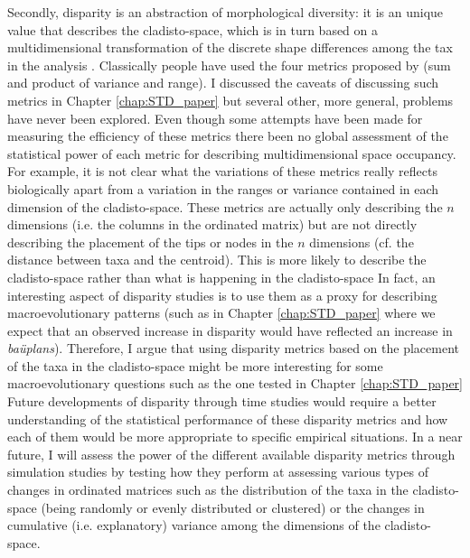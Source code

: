 Secondly, disparity is an abstraction of morphological diversity: it is an unique value that describes the cladisto-space, which is in turn based on a multidimensional transformation of the discrete shape differences among the tax in the analysis \citep{Wills1994,foote1997evolution}.
Classically people have used the four metrics proposed by \cite{Wills1994} (sum and product of variance and range).
I discussed the caveats of discussing such metrics in Chapter \ref{chap:STD_paper} but several other, more general, problems have never been explored.
Even though some attempts have been made for measuring the efficiency of these metrics \citep{Ciampaglio2001} there been no global assessment of the statistical power of each metric for describing multidimensional space occupancy.
For example, it is not clear what the variations of these metrics really reflects biologically apart from a variation in the ranges or variance contained in each dimension of the cladisto-space.
These metrics are actually only describing the $n$ dimensions (i.e. the columns in the ordinated matrix) but are not directly describing the placement of the tips or nodes in the $n$ dimensions (cf. the distance between taxa and the centroid).
This is more likely to describe the cladisto-space rather than what is happening in the cladisto-space %
In fact, an interesting aspect of disparity studies is to use them as a proxy for describing macroevolutionary patterns (such as in Chapter \ref{chap:STD_paper} where we expect that an observed increase in disparity would have reflected an increase in \textit{ba\"{u}plans}).
Therefore, I argue that using disparity metrics based on the placement of the taxa in the cladisto-space might be more interesting for some macroevolutionary questions such as the one tested in Chapter \ref{chap:STD_paper} %
Future developments of disparity through time studies would require a better understanding of the statistical performance of these disparity metrics and how each of them would be more appropriate to specific empirical situations.
In a near future, I will assess the power of the different available disparity metrics \citep[e.g.][]{Wills1994,Ciampaglio2004,Hughes20082013,huang2015origins} through simulation studies by testing how they perform at assessing various types of changes in ordinated matrices such as the distribution of the taxa in the cladisto-space (being randomly or evenly distributed or clustered) or the changes in cumulative (i.e. explanatory) variance among the dimensions of the cladisto-space.

